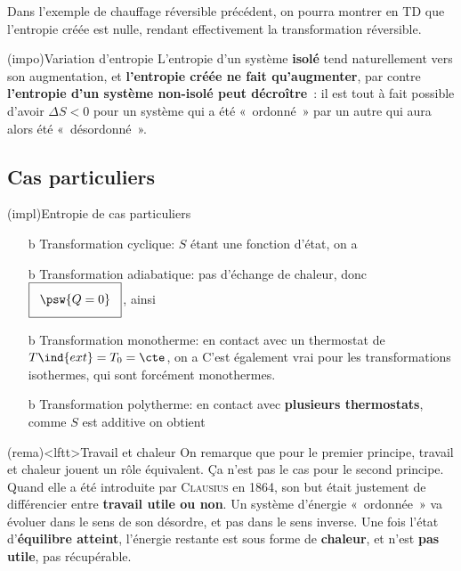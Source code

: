 \documentclass[../../main/main.tex]{subfiles}
\begin{document}
Dans l'exemple de chauffage réversible précédent, on pourra montrer en TD que
l'entropie créée est nulle, rendant effectivement la transformation réversible.

\begin{tcb*}(impo){Variation d'entropie}
	L'entropie d'un système \textbf{isolé} tend naturellement vers son
	augmentation, et \textbf{l'entropie créée ne fait qu'augmenter}, par contre
	\textbf{l'entropie d'un système non-isolé peut décroître}~: il est tout à fait
	possible d'avoir $\Delta{S} < 0$ pour un système qui a été «~ordonné~» par un
	autre qui aura alors été «~désordonné~».
\end{tcb*}

\subsection{Cas particuliers}
\begin{tcb*}[label=impl:caspart](impl){Entropie de cas particuliers}
	\begin{itemize}
		\item[b]{Transformation cyclique}: $S$ étant une fonction d'état, on a
		\psw{%
			\[
				\Delta{S}\ind{cycle} = 0
			\]
		}%
		\vspace*{-25pt}
		\item[b]{Transformation adiabatique}: pas d'échange de chaleur, donc
		$\setlength{\fboxsep}{3mm}\boxed{\psw{Q = 0}}$, ainsi
		\psw{%
			\[
				S\ind{ech} = 0
				\quad \Ra \quad
				\boxed{\Delta{S} = S\ind{cr} \geq 0}
			\]
		}%
		\vspace{-20pt}
		\item[b]{Transformation monotherme}: en contact avec un thermostat de
		$T\ind{ext} = T_0 = \cte$, on a
		\psw{%
			\[
				S\ind{ech} = \int_{I}^{F} \frac{\delta{Q}}{T_0} = \frac{Q}{T_0}
			\]
		}%
		C'est également vrai pour les transformations isothermes, qui sont
		forcément monothermes.
		\item[b]{Transformation polytherme}: en contact avec \textbf{plusieurs
			thermostats}, comme $S$ est additive on obtient
		\psw{%
			\[
				S\ind{ech} = \sum_i \frac{Q_i}{T_i}
			\]
		}%
	\end{itemize}
\end{tcb*}

\begin{tcb}(rema)<lftt>{Travail et chaleur}
	On remarque que pour le premier principe, travail et chaleur jouent un rôle
	équivalent. Ça n'est pas le cas pour le second principe. Quand elle a été
	introduite par \textsc{Clausius} en 1864, son but était justement de
	différencier entre \textbf{travail utile ou non}. Un système d'énergie
	«~ordonnée~» va évoluer dans le sens de son désordre, et pas dans le sens
	inverse. Une fois l'état d'\textbf{équilibre atteint}, l'énergie restante est
	sous forme de \textbf{chaleur}, et n'est \textbf{pas utile}, pas récupérable.
\end{tcb}
\end{document}
